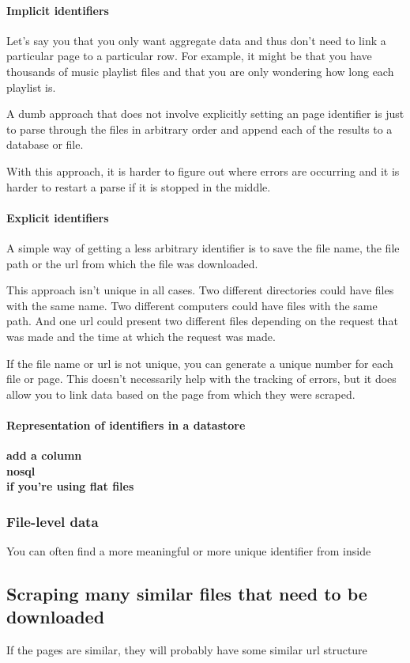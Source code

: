 \documentclass{article}
\newcommand\todo[1]{\textbf{#1}}
\begin{document}
\paragraph{Implicit identifiers}
Let's say you that you only want aggregate data and thus don't need to link
a particular page to a particular row. For example, it might be that you have
thousands of music playlist files and that you are only wondering how long
each playlist is.

A dumb approach that does not involve explicitly setting an page identifier
is just to parse through the files in arbitrary order and append each of the
results to a database or file.

With this approach, it is harder to figure out where errors are occurring
and it is harder to restart a parse if it is stopped in the middle.

\paragraph{Explicit identifiers}
A simple way of getting a less arbitrary identifier is to save the file name,
the file path or the url from which the file was downloaded.

This approach isn't unique in all cases. Two different directories could
have files with the same name. Two different computers could have files with
the same path. And one url could present two different files depending on
the request that was made and the time at which the request was made.

If the file name or url is not unique, you can generate a unique number
for each file or page. This doesn't necessarily help with the tracking of
errors, but it does allow you to link data based on the page from which
they were scraped.

\paragraph{Representation of identifiers in a datastore}
\todo{
add a column\\
nosql\\
if you're using flat files
}


\subsubsection{File-level data}
You can often find a more meaningful or more unique identifier from inside

\subsection{Scraping many similar files that need to be downloaded}
If the pages are similar, they will probably have some similar url structure
\end{document}

